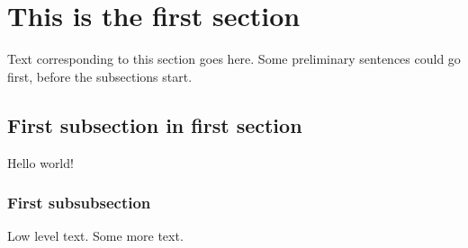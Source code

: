 \documentclass[12pt,a4paper]{article}
\begin{document}
\section{This is the first section}
Text corresponding to this section goes here.  Some preliminary
sentences could go first, before the subsections start. 




\subsection{First subsection in first section}
Hello world!


\subsubsection{First subsubsection}
Low level text.  Some more text.
\end{document}
